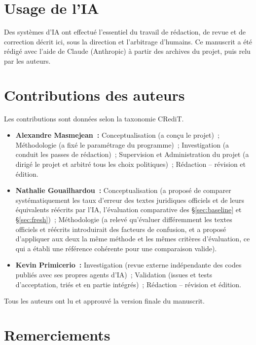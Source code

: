 \documentclass[11pt,a4paper]{article}
\begin{document}
\section*{Usage de l'IA}

Des systèmes d'IA ont effectué l'essentiel du travail de rédaction, de revue et de correction décrit ici, sous la direction et l'arbitrage d'humains. Ce manuscrit a été rédigé avec l'aide de Claude (Anthropic) à partir des archives du projet, puis relu par les auteurs.

\section*{Contributions des auteurs}

Les contributions sont données selon la taxonomie CRediT.
\begin{itemize}
  \item \textbf{Alexandre Masmejean~:} Conceptualisation (a conçu le projet)~; Méthodologie (a fixé le paramétrage du programme)~; Investigation (a conduit les passes de rédaction)~; Supervision et Administration du projet (a dirigé le projet et arbitré tous les choix politiques)~; Rédaction -- révision et édition.
  \item \textbf{Nathalie Gouailhardou~:} Conceptualisation (a proposé de comparer systématiquement les taux d'erreur des textes juridiques officiels et de leurs équivalents réécrits par l'IA, l'évaluation comparative des \S\ref{sec:baseline} et \S\ref{sec:fresh})~; Méthodologie (a relevé qu'évaluer différemment les textes officiels et réécrits introduirait des facteurs de confusion, et a proposé d'appliquer aux deux la même méthode et les mêmes critères d'évaluation, ce qui a établi une référence cohérente pour une comparaison valide).
  \item \textbf{Kevin Primicerio~:} Investigation (revue externe indépendante des codes publiés avec ses propres agents d'IA)~; Validation (issues et tests d'acceptation, triés et en partie intégrés)~; Rédaction -- révision et édition.
\end{itemize}
Tous les auteurs ont lu et approuvé la version finale du manuscrit.

\section*{Remerciements}
\end{document}
